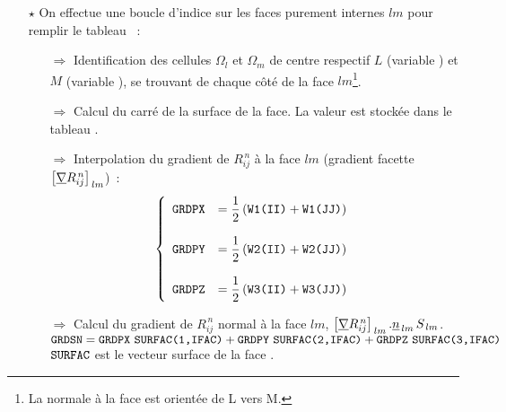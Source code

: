 \begin{itemize}
\begin{itemize}
\item [$\star$] On effectue une boucle d'indice  sur les faces
purement internes $lm$ pour remplir le tableau ~:
\begin{itemize}
\item [$\Rightarrow$] Identification des cellules $\Omega_l$ et $\Omega_m$ de
centre respectif $L$ (variable ) et $M$ (variable ), se trouvant de chaque c\^oté de la face
$lm$\footnote{La normale à la face est orientée de L vers M.}.
\item [$\Rightarrow$] Calcul du carré de la surface de la face. La valeur est
stockée dans le tableau .
\item [$\Rightarrow$] Interpolation du gradient de $R^{\,n}_{ij}$ à la face
$lm$ (gradient facette $\left[\underline{\nabla}{R}^{\,n}_{ij}\right]_{\,lm}$)~:
\begin{equation}\notag
\left\{\begin{array}{ll}
\text{\texttt{GRDPX}} &= \displaystyle \frac{1}{2} \left(\text{\texttt{W1(II)}} + \text{\texttt{W1(JJ)}}
\right) \\
&\\
\text{\texttt{GRDPY}} &= \displaystyle \frac{1}{2} \left(\text{\texttt{W2(II)}} + \text{\texttt{W2(JJ)}} \right) \\
&\\
\text{\texttt{GRDPZ}} &= \displaystyle \frac{1}{2} \left(\text{\texttt{W3(II)}} + \text{\texttt{W3(JJ)}} \right)
\end{array}\right.
\end{equation}
\item [$\Rightarrow$] Calcul du gradient de $R^{\,n}_{ij}$ normal à la face
$lm$, $\left[\underline{\nabla}{R}^{\,n}_{ij}\right]_{\,lm}.\underline{n}_{\,lm}\,S_{\,lm}$.\\

$\displaystyle \var{GRDSN} =  \var{GRDPX} \ \var{SURFAC(1,IFAC)} + \var{GRDPY} \ \var{SURFAC(2,IFAC)} +  \var{GRDPZ} \ \var{SURFAC(3,IFAC)}$
$\text{\texttt{SURFAC}}$ est le vecteur surface de la face .



\end{itemize}
\end{itemize}
\end{itemize}
